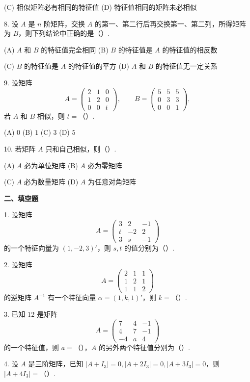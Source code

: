 \documentclass[UTF8, 12pt, fontset=fandol, oneside]{ctexart}
\begin{document}
(C) 相似矩阵必有相同的特征值 \qquad (D) 特征值相同的矩阵未必相似

8. 设 $A$ 是 $n$ 阶矩阵，交换 $A$ 的第一、第二行后再交换第一、第二列，所得矩阵为 $B$，则下列结论中正确的是（\quad ）.

(A) $A$ 和 $B$ 的特征值完全相同 \qquad (B) $B$ 的特征值是 $A$ 的特征值的相反数

(C) $B$ 的特征值是 $A$ 的特征值的平方 \qquad (D) $A$ 和 $B$ 的特征值无一定关系

9. 设矩阵
\[
A=\begin{pmatrix}2&1&0\\1&2&0\\0&0&t\end{pmatrix},\qquad
B=\begin{pmatrix}5&5&5\\0&3&3\\0&0&1\end{pmatrix},
\]
若 $A$ 和 $B$ 相似，则 $t=$（\quad ）.

(A) $0$ \qquad (B) $1$ \qquad (C) $3$ \qquad (D) $5$

10. 若矩阵 $A$ 只和自己相似，则（\quad ）.

(A) $A$ 必为单位矩阵 \qquad (B) $A$ 必为零矩阵

(C) $A$ 必为数量矩阵 \qquad (D) $A$ 为任意对角矩阵

\noindent\textbf{二、填空题}

1. 设矩阵
\[
A=\begin{pmatrix}3&2&-1\\ t&-2&2\\3&s&-1\end{pmatrix}
\]
的一个特征向量为 $(1,-2,3)'$，则 $s,t$ 的值分别为（\quad ）.

2. 设矩阵
\[
A=\begin{pmatrix}2&1&1\\1&2&1\\1&1&2\end{pmatrix}
\]
的逆矩阵 $A^{-1}$ 有一个特征向量 $\alpha=(1,k,1)'$，则 $k=$（\quad ）.

3. 已知 $12$ 是矩阵
\[
A=\begin{pmatrix}7&4&-1\\4&7&-1\\-4&a&4\end{pmatrix}
\]
的一个特征值，则 $a=$（\quad ），$A$ 的另外两个特征值分别为（\quad ）.

4. 设 $A$ 是三阶矩阵，已知 $|A+I_3|=0,|A+2I_3|=0,|A+3I_3|=0$，则 $|A+4I_3|=$（\quad ）.
\end{document}
